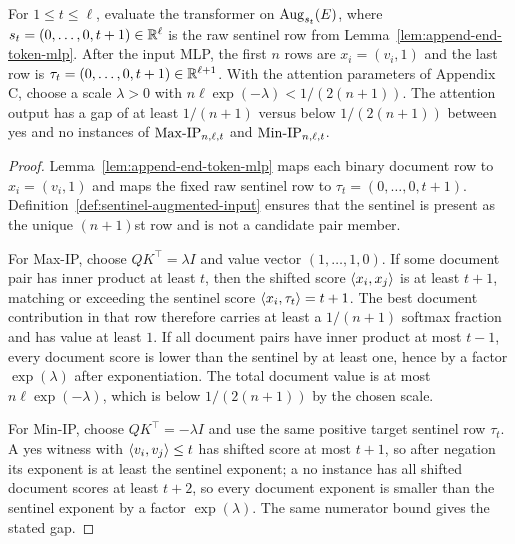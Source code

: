\begin{lemma}
  \label{lem:maxip-minip-attention-gap}
  For $1\leq t\leq\ell$, evaluate the transformer on
  $\operatorname{Aug}_{s_t}(E)$, where $s_t=(0,\ldots,0,t+1)\in\mathbb{R}^\ell$ is the raw sentinel
  row from Lemma~\ref{lem:append-end-token-mlp}.  After the input MLP, the
  first $n$ rows are $x_i=(v_i,1)$ and the last row is
  $\tau_t=(0,\ldots,0,t+1)\in\mathbb{R}^{\ell+1}$.  With the attention parameters of
  Appendix C, choose a scale $\lambda>0$ with
  $n\ell\exp(-\lambda)<1/(2(n+1))$.  The attention output has a gap of at least
  $1/(n+1)$ versus below $1/(2(n+1))$ between yes and no instances of
  $\mathrm{Max\mbox{-}IP}_{n,\ell,t}$ and $\mathrm{Min\mbox{-}IP}_{n,\ell,t}$.
\end{lemma}
\begin{proof}
  Lemma~\ref{lem:append-end-token-mlp} maps each binary document row to
  $x_i=(v_i,1)$ and maps the fixed raw sentinel row to
  $\tau_t=(0,\ldots,0,t+1)$.  Definition~\ref{def:sentinel-augmented-input}
  ensures that the sentinel is present as the unique $(n+1)$st row and is not a
  candidate pair member.

  For Max-IP, choose $QK^\top=\lambda I$ and value vector
  $(1,\ldots,1,0)$.  If some document pair has inner product at least $t$, then
  the shifted score $\left\langle x_i,x_j\right\rangle$ is at least $t+1$, matching or exceeding the
  sentinel score $\left\langle x_i,\tau_t\right\rangle=t+1$.  The best document contribution in
  that row therefore carries at least a $1/(n+1)$ softmax fraction and has
  value at least $1$.  If all document pairs have inner product at most $t-1$,
  every document score is lower than the sentinel by at least one, hence by a
  factor $\exp(\lambda)$ after exponentiation.  The total document value is at
  most $n\ell\exp(-\lambda)$, which is below $1/(2(n+1))$ by the chosen scale.

  For Min-IP, choose $QK^\top=-\lambda I$ and use the same positive target
  sentinel row $\tau_t$.  A yes witness with $\left\langle v_i,v_j\right\rangle\leq t$ has shifted
  score at most $t+1$, so after negation its exponent is at least the sentinel
  exponent; a no instance has all shifted document scores at least $t+2$, so
  every document exponent is smaller than the sentinel exponent by a factor
  $\exp(\lambda)$.  The same numerator bound gives the stated gap.
\end{proof}

